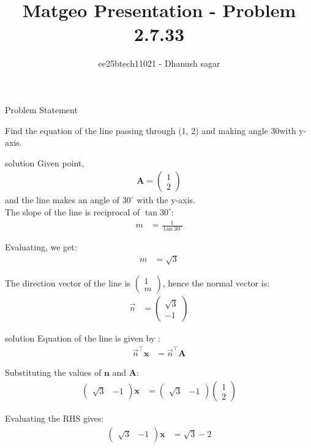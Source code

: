 \documentclass{beamer}
\title{Matgeo Presentation - Problem 2.7.33}
\author{ee25btech11021 - Dhanush sagar}
\numberwithin{equation}{section}
\theoremstyle{remark}
\newcommand{\myvec}[1]{\ensuremath{\begin{pmatrix}#1\end{pmatrix}}}
\let\vec\mathbf
\begin{document}
	

		




\begin{frame}
  \titlepage
\end{frame}

\begin{frame}{Problem Statement}

Find the equation of the line passing through (1, 2) and making angle 30\degree with y-axis.\\
\end{frame}

\begin{frame}{solution}
Given point,
\begin{align}
 \vec{A} = \myvec{1 \\ 2}
\end{align}
and the line makes an angle of $30^\circ$ with the y-axis. \\[6pt]

The slope of the line is reciprocal of $\tan 30^\circ$:  
\begin{align}
m &= \frac{1}{\tan 30^\circ}
\end{align}

Evaluating, we get:  
\begin{align}
m &= \sqrt{3}
\end{align}

The direction vector of the line is $\myvec{1 \\ m}$, hence the normal vector is:  
\begin{align}
\Vec{n} &= \myvec{\sqrt{3} \\ -1}
\end{align}
\end{frame}
\begin{frame}{solution}
Equation of the line is given by :  
\begin{align}
\Vec{n}^\top \vec{x} &=\Vec{n}^\top \vec{A}
\end{align}

Substituting the values of $\vec{n}$ and $\vec{A}$:  
\begin{align}
\myvec{\sqrt{3} & -1} \vec{x} &= \myvec{\sqrt{3} & -1}\myvec{1 \\ 2}
\end{align}

Evaluating the RHS gives:  
\begin{align}
\myvec{\sqrt{3} & -1} \vec{x} &= \sqrt{3} - 2
\end{align}
\end{frame}
\end{document}
